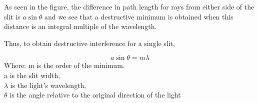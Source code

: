  
  


As seen in the figure, the difference in path length for rays from either side of the slit is  $a \sin{\theta}$  and we see that a destructive minimum is obtained when this distance is an integral multiple of the wavelength.

Thus, to obtain destructive interference for a single slit,

$$ a \sin{\theta} = m \lambda$$ 
Where:
m is the order of the minimum.\\
a is the slit width,\\
$\lambda$  is the light’s wavelength,\\
$\theta$  is the angle relative to the original direction of the light\\

 
 
 
